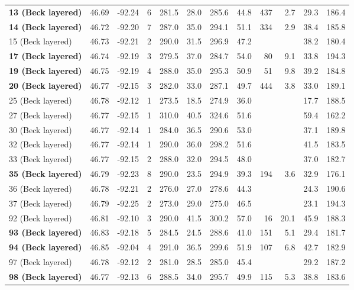 \documentclass[11pt,letterpaper]{article}
\begin{document}
\begin{table}[h!]
\begin{tabular}{|l|r|r|r|r|r|r|r|r|r|r|r|}
\textbf{13 (Beck layered)	}	&	46.69	&	-92.24	&	6	&	281.5	&	28.0	&	285.6	&	44.8	&	437	&	2.7	&	29.3	&	186.4	\\
\textbf{14 (Beck layered)	}	&	46.72	&	-92.20	&	7	&	287.0	&	35.0	&	294.1	&	51.1	&	334	&	2.9	&	38.4	&	185.8	\\
	15 (Beck layered)		&	46.73	&	-92.21	&	2	&	290.0	&	31.5	&	296.9	&	47.2	&		&		&	38.2	&	180.4	\\
\textbf{17 (Beck layered)	}	&	46.74	&	-92.19	&	3	&	279.5	&	37.0	&	284.7	&	54.0	&	80	&	9.1	&	33.8	&	194.3	\\
\textbf{19 (Beck layered)	}	&	46.75	&	-92.19	&	4	&	288.0	&	35.0	&	295.3	&	50.9	&	51	&	9.8	&	39.2	&	184.8	\\
\textbf{20 (Beck layered)	}	&	46.77	&	-92.15	&	3	&	282.0	&	33.0	&	287.1	&	49.7	&	444	&	3.8	&	33.0	&	189.1	\\
	25 (Beck layered)		&	46.78	&	-92.12	&	1	&	273.5	&	18.5	&	274.9	&	36.0	&		&		&	17.7	&	188.5	\\
	27 (Beck layered)		&	46.77	&	-92.15	&	1	&	310.0	&	40.5	&	324.6	&	51.6	&		&		&	59.4	&	162.2	\\
	30 (Beck layered)		&	46.77	&	-92.14	&	1	&	284.0	&	36.5	&	290.6	&	53.0	&		&		&	37.1	&	189.8	\\
	32 (Beck layered)		&	46.77	&	-92.14	&	1	&	290.0	&	36.0	&	298.2	&	51.6	&		&		&	41.5	&	183.5	\\
	33 (Beck layered)		&	46.77	&	-92.15	&	2	&	288.0	&	32.0	&	294.5	&	48.0	&		&		&	37.0	&	182.7	\\
\textbf{35 (Beck layered)	}	&	46.79	&	-92.23	&	8	&	290.0	&	23.5	&	294.9	&	39.3	&	194	&	3.6	&	32.9	&	176.1	\\
	36 (Beck layered)		&	46.78	&	-92.21	&	2	&	276.0	&	27.0	&	278.6	&	44.3	&		&		&	24.3	&	190.6	\\
	37 (Beck layered)		&	46.79	&	-92.25	&	2	&	273.0	&	29.0	&	275.0	&	46.5	&		&		&	23.1	&	194.3	\\
	92 (Beck layered)		&	46.81	&	-92.10	&	3	&	290.0	&	41.5	&	300.2	&	57.0	&	16	&	20.1	&	45.9	&	188.3	\\
\textbf{93 (Beck layered)	}	&	46.83	&	-92.18	&	5	&	284.5	&	24.5	&	288.6	&	41.0	&	151	&	5.1	&	29.4	&	181.7	\\
\textbf{94 (Beck layered)	}	&	46.85	&	-92.04	&	4	&	291.0	&	36.5	&	299.6	&	51.9	&	107	&	6.8	&	42.7	&	182.9	\\
	97 (Beck layered)		&	46.78	&	-92.12	&	2	&	281.0	&	28.5	&	285.0	&	45.4	&		&		&	29.2	&	187.2	\\
\textbf{98 (Beck layered)	}	&	46.77	&	-92.13	&	6	&	288.5	&	34.0	&	295.7	&	49.9	&	115	&	5.3	&	38.8	&	183.6	\\

\end{tabular}
\end{table}
\end{document}
